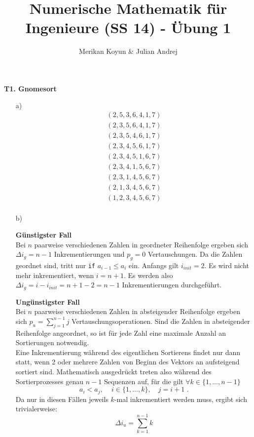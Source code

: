 \documentclass[11pt]{article}
\theoremstyle{plain}
\theoremstyle{definition}
\renewcommand{\a}{\"{a}}
\renewcommand{\u}{\"{u}}
\begin{document}
\title{Numerische Mathematik f\u r Ingenieure (SS 14) - \"{U}bung 1}
\author{Merikan Koyun \& Julian Andrej}
\maketitle

\textbf{T1. Gnomesort}\\
\begin{itemize}
\item[a)]
\begin{align*}
(2, 5, 3, 6, 4, 1, 7)\\
(2, 3, 5, 6, 4, 1, 7)\\
(2, 3, 5, 4, 6, 1, 7)\\
(2, 3, 4, 5, 6, 1, 7)\\
(2, 3, 4, 5, 1, 6, 7)\\
(2, 3, 4, 1, 5, 6, 7)\\
(2, 3, 1, 4, 5, 6, 7)\\
(2, 1, 3, 4, 5, 6, 7)\\
(1, 2, 3, 4, 5, 6, 7)\\
\end{align*}


\item[b)]

\textbf{G\u nstigster Fall}\\
Bei $n$ paarweise verschiedenen Zahlen in geordneter Reihenfolge ergeben sich $\Delta i_g = n-1$ Inkrementierungen und $p_g=0$ Vertauschungen. Da die Zahlen geordnet sind, tritt nur \verb!if! $a_{i-1}\leq a_i$ ein. Anfangs gilt $i_{init}=2$. Es wird nicht mehr inkrementiert, wenn $i=n+1$. Es werden also $\Delta i_g= i - i_{init}= n+1-2 = n-1$ Inkrementierungen durchgef\u hrt.\vspace{0.3cm}

\textbf{Ung\u nstigster Fall}\\
Bei $n$ paarweise verschiedenen Zahlen in absteigender Reihenfolge ergeben sich $p_u=\sum_{j=1}^{n-1} j$ Vertauschungsoperationen.
Sind die Zahlen in absteigender Reihenfolge angeordnet, so ist f\u r jede Zahl eine maximale Anzahl an Sortierungen notwendig.\\



Eine Inkrementierung w\a hrend des eigentlichen Sortierens findet nur dann statt, wenn 2 oder mehrere Zahlen von Beginn des Vektors an aufsteigend sortiert sind. Mathematisch ausgedr\u ckt treten also w\a hrend des Sortierprozesses genau $n-1$ Sequenzen auf, f\u r die gilt $\forall k\in \{1,...,n-1\}$
\begin{equation}
a_i < a_j, \quad \, i\in\{1,...,k\},\quad j=i+1 \text{ .}
\end{equation}
Da nur in diesen F\a llen jeweils $k$-mal inkrementiert werden muss, ergibt sich trivialerweise:
\begin{equation}
\Delta i_u = \sum_{k=1}^{n-1} k
\end{equation}

\end{itemize}
 
\end{document}
